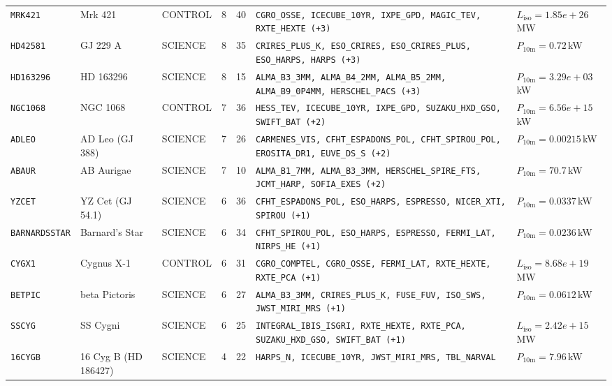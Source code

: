\documentclass[twocolumn,10pt]{article}
\begin{document}
\begin{table}[!ht]
{\begin{tabular}{lllrrll}
\texttt{MRK421} & Mrk 421 & CONTROL & 8 & 40 & \texttt{CGRO\_OSSE, ICECUBE\_10YR, IXPE\_GPD, MAGIC\_TEV, RXTE\_HEXTE (+3)} & $L_{\mathrm{iso}}=1.85e+26$\,MW \\
\texttt{HD42581} & GJ 229 A & SCIENCE & 8 & 35 & \texttt{CRIRES\_PLUS\_K, ESO\_CRIRES, ESO\_CRIRES\_PLUS, ESO\_HARPS, HARPS (+3)} & $P_{10\mathrm{m}}=0.72$\,kW \\
\texttt{HD163296} & HD 163296 & SCIENCE & 8 & 15 & \texttt{ALMA\_B3\_3MM, ALMA\_B4\_2MM, ALMA\_B5\_2MM, ALMA\_B9\_0P4MM, HERSCHEL\_PACS (+3)} & $P_{10\mathrm{m}}=3.29e+03$\,kW \\
\texttt{NGC1068} & NGC 1068 & CONTROL & 7 & 36 & \texttt{HESS\_TEV, ICECUBE\_10YR, IXPE\_GPD, SUZAKU\_HXD\_GSO, SWIFT\_BAT (+2)} & $P_{10\mathrm{m}}=6.56e+15$\,kW \\
\texttt{ADLEO} & AD Leo (GJ 388) & SCIENCE & 7 & 26 & \texttt{CARMENES\_VIS, CFHT\_ESPADONS\_POL, CFHT\_SPIROU\_POL, EROSITA\_DR1, EUVE\_DS\_S (+2)} & $P_{10\mathrm{m}}=0.00215$\,kW \\
\texttt{ABAUR} & AB Aurigae & SCIENCE & 7 & 10 & \texttt{ALMA\_B1\_7MM, ALMA\_B3\_3MM, HERSCHEL\_SPIRE\_FTS, JCMT\_HARP, SOFIA\_EXES (+2)} & $P_{10\mathrm{m}}=70.7$\,kW \\
\texttt{YZCET} & YZ Cet (GJ 54.1) & SCIENCE & 6 & 36 & \texttt{CFHT\_ESPADONS\_POL, ESO\_HARPS, ESPRESSO, NICER\_XTI, SPIROU (+1)} & $P_{10\mathrm{m}}=0.0337$\,kW \\
\texttt{BARNARDSSTAR} & Barnard's Star & SCIENCE & 6 & 34 & \texttt{CFHT\_SPIROU\_POL, ESO\_HARPS, ESPRESSO, FERMI\_LAT, NIRPS\_HE (+1)} & $P_{10\mathrm{m}}=0.0236$\,kW \\
\texttt{CYGX1} & Cygnus X-1 & CONTROL & 6 & 31 & \texttt{CGRO\_COMPTEL, CGRO\_OSSE, FERMI\_LAT, RXTE\_HEXTE, RXTE\_PCA (+1)} & $L_{\mathrm{iso}}=8.68e+19$\,MW \\
\texttt{BETPIC} & beta Pictoris & SCIENCE & 6 & 27 & \texttt{ALMA\_B3\_3MM, CRIRES\_PLUS\_K, FUSE\_FUV, ISO\_SWS, JWST\_MIRI\_MRS (+1)} & $P_{10\mathrm{m}}=0.0612$\,kW \\
\texttt{SSCYG} & SS Cygni & SCIENCE & 6 & 25 & \texttt{INTEGRAL\_IBIS\_ISGRI, RXTE\_HEXTE, RXTE\_PCA, SUZAKU\_HXD\_GSO, SWIFT\_BAT (+1)} & $L_{\mathrm{iso}}=2.42e+15$\,MW \\
\texttt{16CYGB} & 16 Cyg B (HD 186427) & SCIENCE & 4 & 22 & \texttt{HARPS\_N, ICECUBE\_10YR, JWST\_MIRI\_MRS, TBL\_NARVAL} & $P_{10\mathrm{m}}=7.96$\,kW \\
\bottomrule
\end{tabular}%
}
\end{table}
\clearpage
\end{document}

